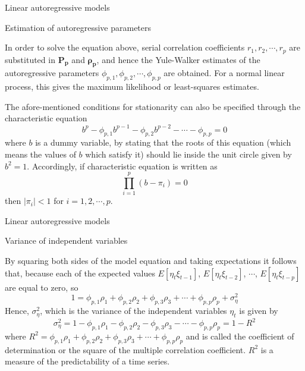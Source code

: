 \documentclass[8pt]{beamer}
\renewcommand{\emph}[1]{\textcolor{myorange}{#1}}
\begin{document}
\begin{frame}{Linear autoregressive models}
        \begin{block}{Estimation of autoregressive parameters}
    \end{block}
    In order to solve the equation above, \emph{serial correlation coefficients} $r_1, r_2, \cdots, r_p$ are substituted in $\mathbf{P_p}$ and $\mathbf{\rho_p}$, and hence the \emph{Yule-Walker} estimates of the \emph{autoregressive  parameters} $\phi_{p,1}, \phi_{p,2}, \cdots, \phi_{p,p}$ are obtained. For a normal \emph{linear process}, this gives the \emph{maximum likelihood} or \emph{least-squares} estimates.

    The afore-mentioned conditions for \emph{stationarity} can also be specified through the \alert{characteristic equation}
    \[
        b^p - \phi_{p,1} b^{p-1} - \phi_{p,2} b^{p-2} - \cdots - \phi_{p,p} = 0
    \]
    where $b$ is a dummy variable, by stating that the roots of this equation (which means the values of $b$ which satisfy it) should lie inside the unit circle given by $b^2 = 1$. Accordingly, if \emph{characteristic equation} is written as
    \[
        \prod_{i=1}^p (b-\pi_i) = 0
    \]
    then $|\pi_i| < 1$ for $i=1,2,\cdots,p$.
\end{frame}

 \begin{frame}{Linear autoregressive models}
     \begin{block}{Variance of independent variables}
    \end{block}
    By squaring both sides of the model equation and taking expectations it follows that, because each of the expected values $E[\eta_t \xi_{t-1}]$, $E[\eta_t \xi_{t-2}]$, $\cdots$, $E[\eta_t \xi_{t-p}]$ are equal to zero, so
    \[
        1 = \phi_{p,1} \rho_1 + \phi_{p,2} \rho_2 + \phi_{p,3} \rho_3 + \cdots + \phi_{p,p} \rho_p + \sigma_{\eta}^2
    \]
    Hence, $\sigma_{\eta}^2$, which is the variance of the independent variables $\eta_t$ is given by 
    \begin{equation}
        \sigma_{\eta}^2 = 1- \phi_{p,1} \rho_1 - \phi_{p,2} \rho_2 - \phi_{p,3} \rho_3 - \cdots - \phi_{p,p} \rho_p =1-R^2
        \label{e49}
    \end{equation}
    where $R^2 = \phi_{p,1} \rho_1 + \phi_{p,2} \rho_2 + \phi_{p,3} \rho_3 + \cdots + \phi_{p,p} \rho_p $ and is called the \alert{coefficient of determination} or the \alert{square of the multiple correlation coefficient}. $R^2$ is a \emph{measure of the predictability} of a time series.
\end{frame}
\end{document}
